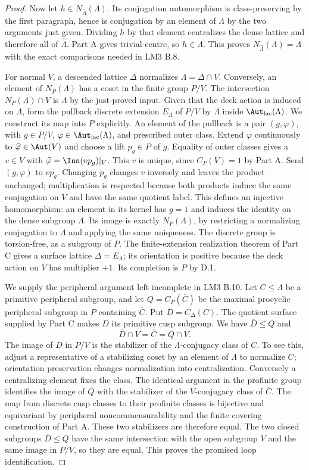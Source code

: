 \begin{proof}
Now let $h\in N_{\widehat\Lambda}(\Lambda)$. Its conjugation automorphism is class-preserving by the first paragraph, hence is conjugation by an element of $\Lambda$ by the two arguments just given. Dividing $h$ by that element centralizes the dense lattice and therefore all of $\widehat\Lambda$. Part A gives trivial centre, so $h\in\Lambda$. This proves $N_{\widehat\Lambda}(\Lambda)=\Lambda$ with the exact comparisons needed in LM3 B.8.

For normal $V$, a descended lattice $\Delta$ normalizes $\Lambda=\Delta\cap V$. Conversely, an element of $N_P(\Lambda)$ has a coset in the finite group $P/V$. The intersection $N_P(\Lambda)\cap V$ is $\Lambda$ by the just-proved input. Given that the deck action is induced on $\Lambda$, form the pullback discrete extension $E_\Lambda$ of $P/V$ by $\Lambda$ inside $\Aut_{\rm lac}(\Lambda)$. We construct its map into $P$ explicitly. An element of the pullback is a pair $(g,\varphi)$, with $g\in P/V$, $\varphi\in\Aut_{\rm lac}(\Lambda)$, and prescribed outer class. Extend $\varphi$ continuously to $\widehat\varphi\in\Aut(V)$ and choose a lift $p_g\in P$ of $g$. Equality of outer classes gives a $v\in V$ with $\widehat\varphi=\Inn(vp_g)|_V$. This $v$ is unique, since $C_P(V)=1$ by Part A. Send $(g,\varphi)$ to $vp_g$. Changing $p_g$ changes $v$ inversely and leaves the product unchanged; multiplication is respected because both products induce the same conjugation on $V$ and have the same quotient label. This defines an injective homomorphism: an element in its kernel has $g=1$ and induces the identity on the dense subgroup $\Lambda$. Its image is exactly $N_P(\Lambda)$, by restricting a normalizing conjugation to $\Lambda$ and applying the same uniqueness. The discrete group is torsion-free, as a subgroup of $P$. The finite-extension realization theorem of Part C gives a surface lattice $\Delta=E_\Lambda$; its orientation is positive because the deck action on $V$ has multiplier $+1$. Its completion is $P$ by D.1.

We supply the peripheral argument left incomplete in LM3 B.10. Let $C\leq\Lambda$ be a primitive peripheral subgroup, and let $Q=C_P(\overline C)$ be the maximal procyclic peripheral subgroup in $P$ containing $\overline C$. Put $D=C_\Delta(C)$. The quotient surface supplied by Part C makes $D$ its primitive cusp subgroup. We have $\overline D\leq Q$ and
\[
 \overline D\cap V=\overline C=Q\cap V.
\]
The image of $D$ in $P/V$ is the stabilizer of the $\Lambda$-conjugacy class of $C$. To see this, adjust a representative of a stabilizing coset by an element of $\Lambda$ to normalize $C$; orientation preservation changes normalization into centralization. Conversely a centralizing element fixes the class. The identical argument in the profinite group identifies the image of $Q$ with the stabilizer of the $V$-conjugacy class of $\overline C$. The map from discrete cusp classes to their profinite classes is bijective and equivariant by peripheral noncommensurability and the finite covering construction of Part A. These two stabilizers are therefore equal. The two closed subgroups $\overline D\leq Q$ have the same intersection with the open subgroup $V$ and the same image in $P/V$, so they are equal. This proves the promised loop identification.


\end{proof}
